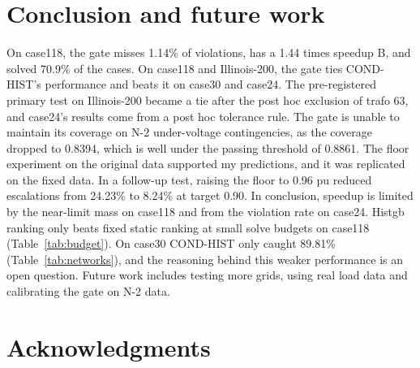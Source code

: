 \documentclass[12pt]{article}
\begin{document}
\section{Conclusion and future work}
\label{sec:conclusion}

On case118, the gate misses 1.14\% of violations, has a 1.44 times speedup B, and solved 70.9\% of the cases. On case118 and Illinois-200, the gate ties COND-HIST's performance and beats it on case30 and case24. The pre-registered primary test on Illinois-200 became a tie after the post hoc exclusion of trafo 63, and case24's results come from a post hoc tolerance rule. The gate is unable to maintain its coverage on N-2 under-voltage contingencies, as the coverage dropped to 0.8394, which is well under the passing threshold of 0.8861. The floor experiment on the original data supported my predictions, and it was replicated on the fixed data. In a follow-up test, raising the floor to 0.96 pu reduced escalations from 24.23\% to 8.24\% at target 0.90. In conclusion, speedup is limited by the near-limit mass on case118 and from the violation rate on case24. Histgb ranking only beats fixed static ranking at small solve budgets on case118 (Table~\ref{tab:budget}). On case30 COND-HIST only caught 89.81\% (Table~\ref{tab:networks}), and the reasoning behind this weaker performance is an open question. Future work includes testing more grids, using real load data and calibrating the gate on N-2 data.


\section*{Acknowledgments}
\end{document}
